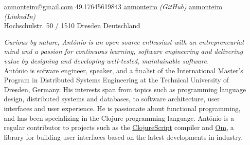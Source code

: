 \documentclass[10pt,a4paper]{article}
\begin{document}
\sloppy  %


\nobreakvspace{0.3em}  %

\noindent\href{mailto:anmonteiro.at.gmail.dot.com}{anmonteiro\mbox{}@\mbox{}gmail.com}\sbull
\textsmaller{+}49.17645619843\sbull
{\newnums \href{http://www.github.com/anmonteiro}{anmonteiro}} \emph{(GitHub)}\sbull
\href{http://www.linkedin.com/in/anmonteiro}{anmonteiro} \emph{(LinkedIn)}
\\
Hochschulstr. 50 / 1510 Dresden\sbull
Deutschland

\spacedhrule{0.9em}{-0.4em}  %


\vspace{-1.3em}  %
\begin{multicols}{2}  %
\emph{Curious by nature, António is an open source enthusiast with an entrepreneurial
mind and a passion for continuous learning, software engineering and delivering value
by designing and developing well-tested, maintainable software.} \\

António is sofware engineer, speaker, and a finalist of the International Master's
Program in Distributed Systems Engineering at the Technical University of Dresden,
Germany. His interests span from topics such as programming language design, distributed
systems and databases, to software architecture, user interfaces and user experience.
He is passionate about functional programming, and has been specializing in the Clojure
programming language. António is a regular contributor to projects such as the
\href{http://clojurescript.org/}{ClojureScript} compiler and \href{https://github.com/omcljs/om}{Om},
a library for building user interfaces based on the latest developments in industry.
\end{multicols}
\end{document}
